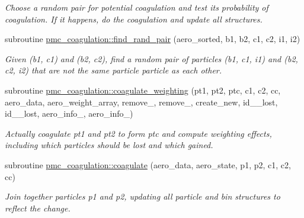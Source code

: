 \begin{DoxyCompactItemize}
\begin{DoxyCompactList}\small\item\em Choose a random pair for potential coagulation and test its probability of coagulation. If it happens, do the coagulation and update all structures. \end{DoxyCompactList}\item 
subroutine \mbox{\hyperlink{namespacepmc__coagulation_a3911bb2973186595a452bffc1bf37e9e}{pmc\+\_\+coagulation\+::find\+\_\+rand\+\_\+pair}} (aero\+\_\+sorted, b1, b2, c1, c2, i1, i2)
\begin{DoxyCompactList}\small\item\em Given {\ttfamily (b1, c1)} and {\ttfamily (b2, c2)}, find a random pair of particles {\ttfamily (b1, c1, i1)} and {\ttfamily (b2, c2, i2)} that are not the same particle particle as each other. \end{DoxyCompactList}\item 
subroutine \mbox{\hyperlink{namespacepmc__coagulation_a5cc62e6e5a1af2843681d766563f6364}{pmc\+\_\+coagulation\+::coagulate\+\_\+weighting}} (pt1, pt2, ptc, c1, c2, cc, aero\+\_\+data, aero\+\_\+weight\+\_\+array, remove\+\_, remove\+\_, create\+\_\+new, id\+\_\+\_\+lost, id\+\_\+\_\+lost, aero\+\_\+info\+\_, aero\+\_\+info\+\_)
\begin{DoxyCompactList}\small\item\em Actually coagulate pt1 and pt2 to form ptc and compute weighting effects, including which particles should be lost and which gained. \end{DoxyCompactList}\item 
subroutine \mbox{\hyperlink{namespacepmc__coagulation_a8bcb727a5fd3e8551a3139f75b996590}{pmc\+\_\+coagulation\+::coagulate}} (aero\+\_\+data, aero\+\_\+state, p1, p2, c1, c2, cc)
\begin{DoxyCompactList}\small\item\em Join together particles {\ttfamily p1} and {\ttfamily p2}, updating all particle and bin structures to reflect the change. \end{DoxyCompactList}\end{DoxyCompactItemize}
